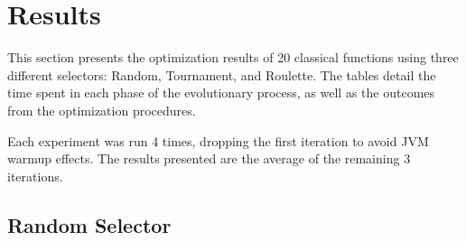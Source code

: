 \section{Results}
\label{sec:fn_opt:results}

  This section presents the optimization results of 20 classical functions 
  using three different selectors: Random, Tournament, and Roulette. The tables 
  detail the time spent in each phase of the evolutionary process, as well as 
  the outcomes from the optimization procedures.

  Each experiment was run 4 times, dropping the first iteration to avoid
  JVM warmup effects. The results presented are the average of the remaining
  3 iterations.

  \newpage

  \subsection{Random Selector}
